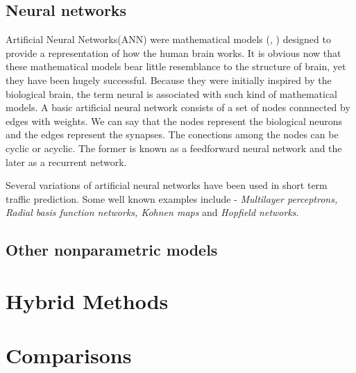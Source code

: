 \subsection{Neural networks}
\label{subsec:neuralNetworksTrafficPred}
Artificial Neural Networks(ANN) were mathematical models (\citet{mcculloch1943logical},
\citet{rosenblatt1958perceptron}) designed to  provide a representation of how the human brain
works. It is obvious now that these mathematical models bear little resemblance to the structure
of brain, yet they have been hugely successful. Because they were initially inspired by the
biological brain, the term neural is associated with such kind of mathematical models. A basic
artificial neural network consists of a set of nodes connnected by edges with weights. We can say
that the nodes represent the biological neurons and the edges represent the synapses. The
conections among the nodes can be cyclic or acyclic. The former is known as a feedforward neural
network and the later as a recurrent network.

Several variations of artificial neural networks have been used in short term traffic prediction.
Some well known examples include - \textit{Multilayer perceptrons, Radial basis function
networks, Kohnen maps} and \textit{Hopfield networks}.


\subsection{Other nonparametric models}

\section{Hybrid Methods}


\section{Comparisons}
